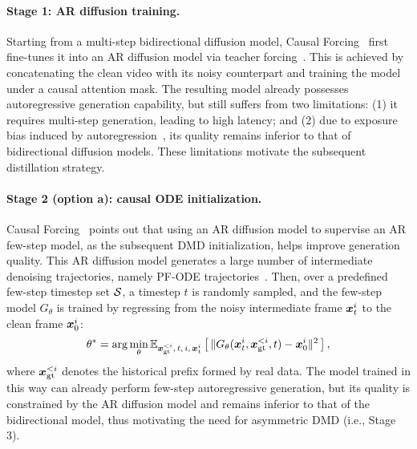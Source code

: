 \paragraph{Stage 1: AR diffusion training.} Starting from a multi-step bidirectional diffusion model, Causal Forcing~\cite{zhu2026causal} first fine-tunes it into an AR diffusion model via teacher forcing~\cite{teng2025magi}. This is achieved by concatenating the clean video with its noisy counterpart and training the model under a causal attention mask. The resulting model already possesses autoregressive generation capability, but still suffers from two limitations: (1) it requires multi-step generation, leading to high latency; and (2) due to exposure bias induced by autoregression~\cite{yin2025slow}, its quality remains inferior to that of bidirectional diffusion models. These limitations motivate the subsequent distillation strategy.



\paragraph{Stage 2 (option a): causal ODE initialization.} Causal Forcing~\cite{zhu2026causal} points out that using an AR diffusion model to supervise an AR few-step model, as the subsequent DMD initialization, helps improve generation quality. This AR diffusion model generates a large number of intermediate denoising trajectories, namely PF-ODE trajectories~\cite{song2020score}. Then, over a predefined few-step timestep set ${\mathcal{S}}$, a timestep $t$ is randomly sampled, and the few-step model $G_\theta$ is trained by regressing from the noisy intermediate frame ${\bm{x}}_t^i$ to the clean frame ${\bm{x}}_0^i$:
\begin{align}
    \theta^*=\arg\min_\theta \mathbb{E}_{{\bm{x}}_{\mathrm{gt}}^{<i},\, t,\, i,\, {\bm{x}}_t^i}\left[\,\|G_\theta({\bm{x}}_t^i,{\bm{x}}_{\mathrm{gt}}^{<i}, t)-{\bm{x}}_0^i\|^2\,\right],
\end{align}
where ${\bm{x}}_{\mathrm{gt}}^{<i}$ denotes the historical prefix formed by real data. The model trained in this way can already perform few-step autoregressive generation, but its quality is constrained by the AR diffusion model and remains inferior to that of the bidirectional model, thus motivating the need for asymmetric DMD (i.e., Stage 3).


